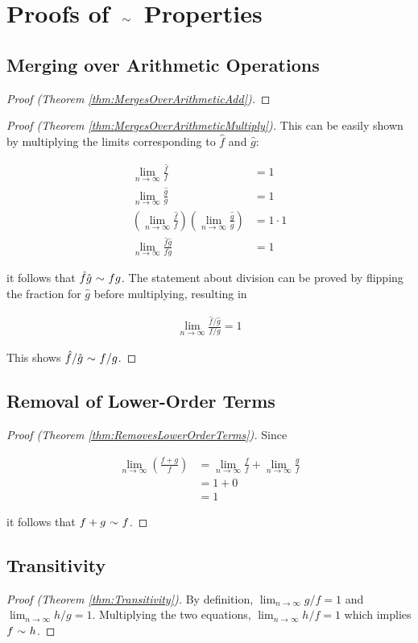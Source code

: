 \appendix
\appendixpage

\section{Proofs of $\ \mathtt{\sim}\ $ Properties}

\subsection{Merging over Arithmetic Operations}
\label{pf:MergesOverArithmetic}

\begin{proof}[Proof (Theorem \ref{thm:MergesOverArithmeticAdd})]
\end{proof}

\begin{proof}[Proof (Theorem \ref{thm:MergesOverArithmeticMultiply})]
	This can be easily shown by multiplying the limits corresponding to $\hat{f}$ and $\hat{g}$:
	
	\begin{align*}
	\lim_{n \to \infty} \frac{\hat{f}}{f} &= 1\\
	\lim_{n \to \infty} \frac{\hat{g}}{g} &= 1\\
	\left( \lim_{n \to \infty} \frac{\hat{f}}{f} \right) \left( \lim_{n \to \infty} \frac{\hat{g}}{g} \right) &= 1 \cdot 1\\
	\lim_{n \to \infty} \frac{\hat{f}\hat{g}}{fg} &= 1
	\end{align*}
	
	it follows that $\hat{f}\hat{g} \ \mathtt{\sim}\  fg$. The statement about division can be proved by flipping the fraction for $\hat{g}$ before multiplying, resulting in
	
	\begin{align*}
	\lim_{n \to \infty} \frac{\hat{f} / \hat{g}}{f / g} = 1
	\end{align*}
	
	This shows $\hat{f} / \hat{g} \ \mathtt{\sim}\  f / g$.
\end{proof}

\subsection{Removal of Lower-Order Terms}
\label{pf:RemovesLowerOrderTerms}

\begin{proof}[Proof (Theorem \ref{thm:RemovesLowerOrderTerms})]
	Since
	
	\begin{align*}
	\lim_{n \to \infty} \left( \frac{f + g}{f} \right) &= \lim_{n \to \infty} \frac{f}{f} + \lim_{n \to \infty} \frac{g}{f}\\
	&= 1 + 0\\
	&= 1
	\end{align*}
	
	it follows that $f + g \ \mathtt{\sim}\  f$.
\end{proof}

\subsection{Transitivity}
\label{pf:Transitivity}

\begin{proof}[Proof (Theorem \ref{thm:Transitivity})]
By definition, $\lim_{n \to \infty} g / f = 1$ and $\lim_{n \to \infty} h / g = 1$. Multiplying the two equations, $\lim_{n \to \infty} h / f = 1$ which implies $f \ \mathtt{\sim}\  h$.
\end{proof}